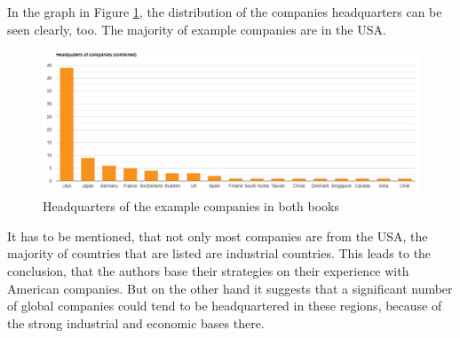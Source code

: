 \documentclass[a4]{scrartcl}
\begin{document}
In the graph in Figure \ref{fig:C_graph}, the distribution of the companies headquarters can be seen clearly, too. The majority of example companies are in the USA.

\begin{figure}[h!]
	\centering
	\includegraphics[width=1\textwidth]{images/combi_graph.png}
	\caption{Headquarters of the example companies in both books \cite{digitalmatrix, leadingdigital}}
	\label{fig:C_graph}
\end{figure}

It has to be mentioned, that not only most companies are from the USA, the majority of countries that are listed are industrial countries. This leads to the conclusion, that the authors base their strategies on their experience with American companies. But on the other hand it suggests that a significant number of global companies could tend to be headquartered in these regions, because of the strong industrial and economic bases there. \cite{basis1, basis2}
\end{document}
